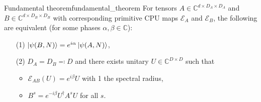 \begin{theorem}{Fundamental theorem}{fundamental_theorem}
For tensors $A \in \mathbb{C}^{d \times D_A \times D_A}$ and $B \in \mathbb{C}^{d \times D_B \times D_B}$ with corresponding primitive CPU maps $\mathcal{E}_A$ and $\mathcal{E}_B$, the following are equivalent (for some phases $\alpha,\beta \in \mathbb{C}$):
\begin{enumerate}
	\item[(1)] $\ket{\psi(B,N)} = e^{i \alpha} \ket{\psi(A,N)}$,
	\item[(2)]  $D_A = D_B \eqqcolon D$ and there exists unitary $U \in \mathbb{C}^{D \times D}$ such that 
	\begin{itemize}
		\item $\mathcal{E}_{AB}(U) = e^{i\beta}U$ with 1 the spectral radius,
		\item $B^s = e^{-i\beta}U^{\dagger} A^s U$ for all $s$.
	\end{itemize}
\end{enumerate}
\end{theorem}
